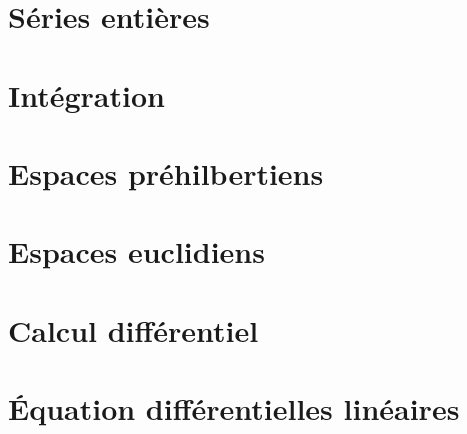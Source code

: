 \documentclass[12pt]{article}
\theoremstyle{remark}
\theoremstyle{remark}
\begin{document}
\section{Séries entières}
\cleardoublepage
\section{Intégration}
\cleardoublepage
\section{Espaces préhilbertiens}
\cleardoublepage
\section{Espaces euclidiens}
\cleardoublepage
\section{Calcul différentiel}
\cleardoublepage
\section{\'Equation différentielles linéaires}
\end{document}
